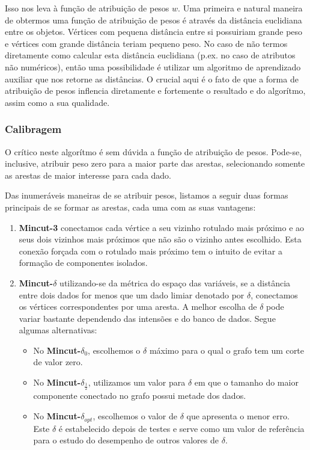 \documentclass[12pt]{article}
\begin{document}
Isso nos leva à função de atribuição de pesos $w$. Uma primeira e natural maneira de obtermos uma função de atribuição de pesos é através da distância euclidiana entre os objetos. Vértices com pequena distância entre si possuiriam grande peso e vértices com grande distância teriam pequeno peso. No caso de não termos diretamente como calcular esta distância euclidiana (p.ex. no caso de atributos não numéricos), então uma possibilidade é utilizar um algoritmo de aprendizado auxiliar que nos retorne as distâncias. O crucial aqui é o fato de que a forma de atribuição de pesos inflencia diretamente e fortemente o resultado e do algorítmo, assim como a sua qualidade.

\subsubsection{Calibragem}
O crítico neste algorítmo é sem dúvida a função de atribuição de pesos. Pode-se, inclusive, atribuir peso zero para a maior parte das arestas, selecionando somente as arestas de maior interesse para cada dado.

Das inumeráveis maneiras de se atribuir pesos, listamos a seguir duas formas principais de se formar as arestas, cada uma com as suas vantagens:

\begin{enumerate}
  \item {\bf Mincut-3} conectamos cada vértice a seu vizinho rotulado mais próximo e ao seus dois vizinhos mais próximos que não são o vizinho antes escolhido. Esta conexão forçada com o rotulado mais próximo tem o intuito de evitar a formação de componentes isolados.

  \item {\bf Mincut-$\delta$} utilizando-se da métrica do espaço das variáveis, se a distância entre dois dados for menos que um dado limiar denotado por $\delta$, conectamos os vértices correspondentes por uma aresta. A melhor escolha de $\delta$ pode variar bastante dependendo das intensões e do banco de dados. Segue algumas alternativas:
  \begin{itemize}
    \item No {\bf Mincut-$\delta_0$}, escolhemos o $\delta$ máximo para o qual o grafo tem um corte de valor zero.

    \item No {\bf Mincut-$\delta_\frac{1}{2}$}, utilizamos um valor para $\delta$ em que o tamanho do maior componente conectado no grafo possui metade dos dados.

    \item No {\bf Mincut-$\delta_{opt}$}, escolhemos o valor de $\delta$ que apresenta o menor erro. Este $\delta$ é estabelecido depois de testes e serve como um valor de referência para o estudo do desempenho de outros valores de $\delta$.
  \end{itemize}
\end{enumerate}
\end{document}
